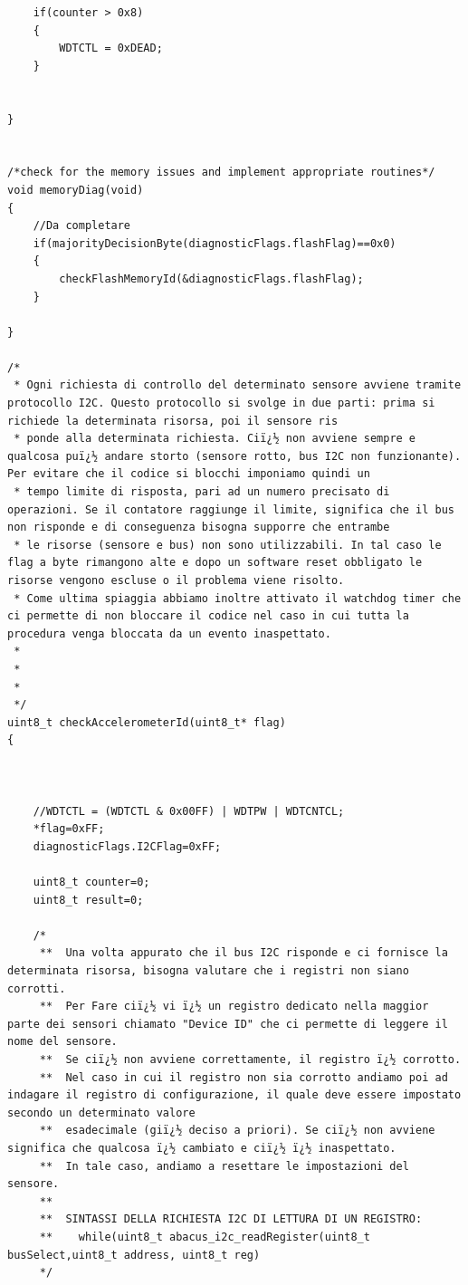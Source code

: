 \documentclass[LaM,binding=0.6cm,oneside]{../sapthesis}
\begin{document}
\begin{lstlisting}
    if(counter > 0x8)
    {                                             
        WDTCTL = 0xDEAD;
    }


}


/*check for the memory issues and implement appropriate routines*/
void memoryDiag(void)
{
    //Da completare
    if(majorityDecisionByte(diagnosticFlags.flashFlag)==0x0)
    {
        checkFlashMemoryId(&diagnosticFlags.flashFlag);
    }

}

/*
 * Ogni richiesta di controllo del determinato sensore avviene tramite protocollo I2C. Questo protocollo si svolge in due parti: prima si richiede la determinata risorsa, poi il sensore ris
 * ponde alla determinata richiesta. Ciï¿½ non avviene sempre e qualcosa puï¿½ andare storto (sensore rotto, bus I2C non funzionante). Per evitare che il codice si blocchi imponiamo quindi un
 * tempo limite di risposta, pari ad un numero precisato di operazioni. Se il contatore raggiunge il limite, significa che il bus non risponde e di conseguenza bisogna supporre che entrambe
 * le risorse (sensore e bus) non sono utilizzabili. In tal caso le flag a byte rimangono alte e dopo un software reset obbligato le risorse vengono escluse o il problema viene risolto.
 * Come ultima spiaggia abbiamo inoltre attivato il watchdog timer che ci permette di non bloccare il codice nel caso in cui tutta la procedura venga bloccata da un evento inaspettato.
 *
 *
 *
 */
uint8_t checkAccelerometerId(uint8_t* flag)
{



    //WDTCTL = (WDTCTL & 0x00FF) | WDTPW | WDTCNTCL;
    *flag=0xFF;
    diagnosticFlags.I2CFlag=0xFF;

    uint8_t counter=0;
    uint8_t result=0;

    /*
     **  Una volta appurato che il bus I2C risponde e ci fornisce la determinata risorsa, bisogna valutare che i registri non siano corrotti.
     **  Per Fare ciï¿½ vi ï¿½ un registro dedicato nella maggior parte dei sensori chiamato "Device ID" che ci permette di leggere il nome del sensore.
     **  Se ciï¿½ non avviene correttamente, il registro ï¿½ corrotto.
     **  Nel caso in cui il registro non sia corrotto andiamo poi ad indagare il registro di configurazione, il quale deve essere impostato secondo un determinato valore
     **  esadecimale (giï¿½ deciso a priori). Se ciï¿½ non avviene significa che qualcosa ï¿½ cambiato e ciï¿½ ï¿½ inaspettato.
     **  In tale caso, andiamo a resettare le impostazioni del sensore.
     **
     **  SINTASSI DELLA RICHIESTA I2C DI LETTURA DI UN REGISTRO:
     **    while(uint8_t abacus_i2c_readRegister(uint8_t busSelect,uint8_t address, uint8_t reg)
     */



\end{lstlisting}
\end{document}
